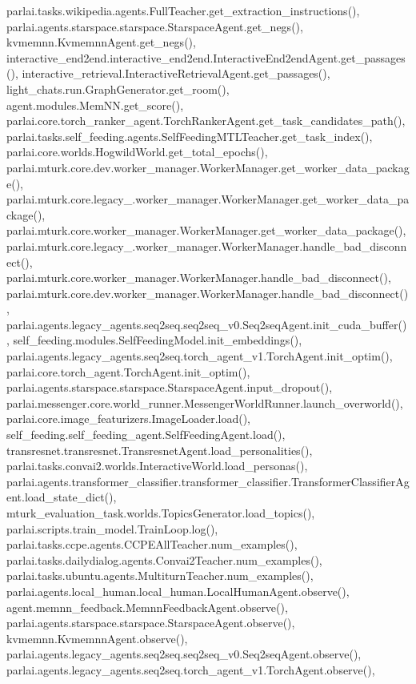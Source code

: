 parlai.\+tasks.\+wikipedia.\+agents.\+Full\+Teacher.\+get\+\_\+extraction\+\_\+instructions(), parlai.\+agents.\+starspace.\+starspace.\+Starspace\+Agent.\+get\+\_\+negs(), kvmemnn.\+Kvmemnn\+Agent.\+get\+\_\+negs(), interactive\+\_\+end2end.\+interactive\+\_\+end2end.\+Interactive\+End2end\+Agent.\+get\+\_\+passages(), interactive\+\_\+retrieval.\+Interactive\+Retrieval\+Agent.\+get\+\_\+passages(), light\+\_\+chats.\+run.\+Graph\+Generator.\+get\+\_\+room(), agent.\+modules.\+Mem\+N\+N.\+get\+\_\+score(), parlai.\+core.\+torch\+\_\+ranker\+\_\+agent.\+Torch\+Ranker\+Agent.\+get\+\_\+task\+\_\+candidates\+\_\+path(), parlai.\+tasks.\+self\+\_\+feeding.\+agents.\+Self\+Feeding\+M\+T\+L\+Teacher.\+get\+\_\+task\+\_\+index(), parlai.\+core.\+worlds.\+Hogwild\+World.\+get\+\_\+total\+\_\+epochs(), parlai.\+mturk.\+core.\+dev.\+worker\+\_\+manager.\+Worker\+Manager.\+get\+\_\+worker\+\_\+data\+\_\+package(), parlai.\+mturk.\+core.\+legacy\+\_.\+worker\+\_\+manager.\+Worker\+Manager.\+get\+\_\+worker\+\_\+data\+\_\+package(), parlai.\+mturk.\+core.\+worker\+\_\+manager.\+Worker\+Manager.\+get\+\_\+worker\+\_\+data\+\_\+package(), parlai.\+mturk.\+core.\+legacy\+\_.\+worker\+\_\+manager.\+Worker\+Manager.\+handle\+\_\+bad\+\_\+disconnect(), parlai.\+mturk.\+core.\+worker\+\_\+manager.\+Worker\+Manager.\+handle\+\_\+bad\+\_\+disconnect(), parlai.\+mturk.\+core.\+dev.\+worker\+\_\+manager.\+Worker\+Manager.\+handle\+\_\+bad\+\_\+disconnect(), parlai.\+agents.\+legacy\+\_\+agents.\+seq2seq.\+seq2seq\+\_\+v0.\+Seq2seq\+Agent.\+init\+\_\+cuda\+\_\+buffer(), self\+\_\+feeding.\+modules.\+Self\+Feeding\+Model.\+init\+\_\+embeddings(), parlai.\+agents.\+legacy\+\_\+agents.\+seq2seq.\+torch\+\_\+agent\+\_\+v1.\+Torch\+Agent.\+init\+\_\+optim(), parlai.\+core.\+torch\+\_\+agent.\+Torch\+Agent.\+init\+\_\+optim(), parlai.\+agents.\+starspace.\+starspace.\+Starspace\+Agent.\+input\+\_\+dropout(), parlai.\+messenger.\+core.\+world\+\_\+runner.\+Messenger\+World\+Runner.\+launch\+\_\+overworld(), parlai.\+core.\+image\+\_\+featurizers.\+Image\+Loader.\+load(), self\+\_\+feeding.\+self\+\_\+feeding\+\_\+agent.\+Self\+Feeding\+Agent.\+load(), transresnet.\+transresnet.\+Transresnet\+Agent.\+load\+\_\+personalities(), parlai.\+tasks.\+convai2.\+worlds.\+Interactive\+World.\+load\+\_\+personas(), parlai.\+agents.\+transformer\+\_\+classifier.\+transformer\+\_\+classifier.\+Transformer\+Classifier\+Agent.\+load\+\_\+state\+\_\+dict(), mturk\+\_\+evaluation\+\_\+task.\+worlds.\+Topics\+Generator.\+load\+\_\+topics(), parlai.\+scripts.\+train\+\_\+model.\+Train\+Loop.\+log(), parlai.\+tasks.\+ccpe.\+agents.\+C\+C\+P\+E\+All\+Teacher.\+num\+\_\+examples(), parlai.\+tasks.\+dailydialog.\+agents.\+Convai2\+Teacher.\+num\+\_\+examples(), parlai.\+tasks.\+ubuntu.\+agents.\+Multiturn\+Teacher.\+num\+\_\+examples(), parlai.\+agents.\+local\+\_\+human.\+local\+\_\+human.\+Local\+Human\+Agent.\+observe(), agent.\+memnn\+\_\+feedback.\+Memnn\+Feedback\+Agent.\+observe(), parlai.\+agents.\+starspace.\+starspace.\+Starspace\+Agent.\+observe(), kvmemnn.\+Kvmemnn\+Agent.\+observe(), parlai.\+agents.\+legacy\+\_\+agents.\+seq2seq.\+seq2seq\+\_\+v0.\+Seq2seq\+Agent.\+observe(), parlai.\+agents.\+legacy\+\_\+agents.\+seq2seq.\+torch\+\_\+agent\+\_\+v1.\+Torch\+Agent.\+observe(), 